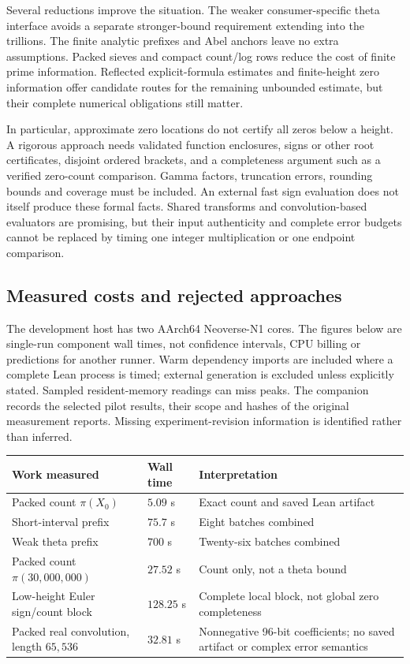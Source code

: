 \documentclass[11pt]{amsart}
\theoremstyle{definition}
\newcommand{\code}[1]{\path{#1}}
\begin{document}
Several reductions improve the situation. The weaker consumer-specific
theta interface avoids a separate stronger-bound requirement extending
into the trillions. The finite analytic prefixes and Abel anchors leave no
extra assumptions. Packed sieves and compact count/log rows reduce the
cost of finite prime information. Reflected explicit-formula estimates and
finite-height zero information offer candidate routes for the remaining
unbounded estimate, but their complete numerical obligations still matter.

In particular, approximate zero locations do not certify all zeros below a
height. A rigorous approach needs validated function enclosures, signs or
other root certificates, disjoint ordered brackets, and a completeness
argument such as a verified zero-count comparison. Gamma factors,
truncation errors, rounding bounds and coverage must be included. An
external fast sign evaluation does not itself produce these formal facts.
Shared transforms and convolution-based evaluators are promising, but their
input authenticity and complete error budgets cannot be replaced by timing
one integer multiplication or one endpoint comparison.

\subsection{Measured costs and rejected approaches}
The development host has two AArch64 Neoverse-N1 cores. The figures below
are single-run component wall times, not confidence intervals, CPU billing
or predictions for another runner. Warm dependency imports are included
where a complete Lean process is timed; external generation is excluded
unless explicitly stated. Sampled resident-memory readings can miss peaks.
The companion \code{paper/conditional-resources.json} records the selected
pilot results, their scope and hashes of the original measurement reports.
Missing experiment-revision information is identified rather than inferred.

\begin{center}\small
\begin{tabular}{@{}L{.35\textwidth}L{.16\textwidth}L{.40\textwidth}@{}}
\toprule
Work measured & Wall time & Interpretation\\
\midrule
Packed count $\pi(X_0)$ & $5.09$ s & Exact count and saved Lean artifact\\
Short-interval prefix & $75.7$ s & Eight batches combined\\
Weak theta prefix & $700$ s & Twenty-six batches combined\\
Packed count $\pi(30{,}000{,}000)$ & $27.52$ s & Count only, not a theta bound\\
Low-height Euler sign/count block & $128.25$ s & Complete local block, not
global zero completeness\\
Packed real convolution, length $65{,}536$ & $32.81$ s & Nonnegative
96-bit coefficients; no saved artifact or complex error semantics\\
\bottomrule
\end{tabular}
\end{center}
\end{document}
